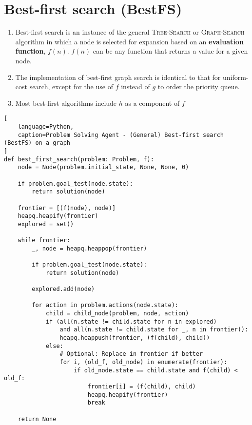 \section{Best-first search (BestFS) \cite{ai/book/Artificial-Intelligence-A-Modern-Approach/Russell-Norvig}}
\label{AI: Algorithms/Best-first search (BestFS)}


\begin{enumerate}
    \item Best-first search is an instance of the general \textsc{Tree-Search} or \textsc{Graph-Search} algorithm in which a node is selected for expansion based on an \textbf{evaluation function}, $f(n)$. $f(n)$ can be any function that returns a value for a given node.
    \hfill \cite{ai/book/Artificial-Intelligence-A-Modern-Approach/Russell-Norvig}

    \item The implementation of best-first graph search is identical to that for uniform-cost search, except for the use of $f$ instead of $g$ to order the priority queue.
    \hfill \cite{ai/book/Artificial-Intelligence-A-Modern-Approach/Russell-Norvig}

    \item Most best-first algorithms include $h$ as a component of $f$
    \hfill \cite{ai/book/Artificial-Intelligence-A-Modern-Approach/Russell-Norvig}
\end{enumerate}


\begin{lstlisting}[
    language=Python,
    caption=Problem Solving Agent - (General) Best-first search (BestFS) on a graph
]
def best_first_search(problem: Problem, f):
    node = Node(problem.initial_state, None, None, 0)

    if problem.goal_test(node.state):
        return solution(node)

    frontier = [(f(node), node)]
    heapq.heapify(frontier)
    explored = set()

    while frontier:
        _, node = heapq.heappop(frontier)

        if problem.goal_test(node.state):
            return solution(node)

        explored.add(node)

        for action in problem.actions(node.state):
            child = child_node(problem, node, action)
            if (all(n.state != child.state for n in explored) 
                and all(n.state != child.state for _, n in frontier)):
                heapq.heappush(frontier, (f(child), child))
            else:
                # Optional: Replace in frontier if better
                for i, (old_f, old_node) in enumerate(frontier):
                    if old_node.state == child.state and f(child) < old_f:
                        frontier[i] = (f(child), child)
                        heapq.heapify(frontier)
                        break

    return None
\end{lstlisting}




